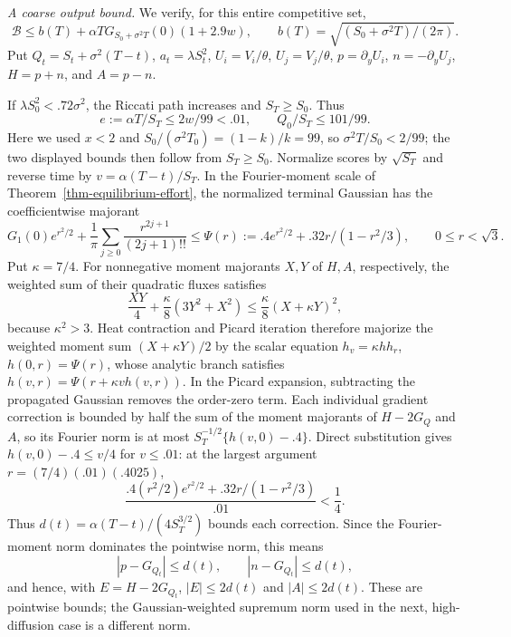 \documentclass[mnsc]{informs3}
\begin{document}
\begin{APPENDICES}
{\emph{A coarse output bound.}
We verify, for this entire competitive set,
\begin{equation}\label{eq-design-competitive-output-screen}
\mathcal B\leq b(T)+\alpha T G_{S_0+\sigma^2T}(0)(1+2.9w),
\qquad b(T)=\sqrt{(S_0+\sigma^2T)/(2\pi)}.
\end{equation}
Put $Q_t=S_t+\sigma^2(T-t)$, $a_t=\lambda S_t^2$,
$U_i=V_i/\theta$, $U_j=V_j/\theta$, $p=\partial_yU_i$, $n=-\partial_yU_j$,
$H=p+n$, and $A=p-n$.

If $\lambda S_0^2<.72\sigma^2$, the Riccati path increases and
$S_T\geq S_0$. Thus
\[
e:=\alpha T/S_T\leq2w/99<.01,\qquad Q_0/S_T\leq101/99.
\]
Here we used $x<2$ and
$S_0/(\sigma^2T_0)=(1-k)/k=99$, so
$\sigma^2T/S_0<2/99$; the two displayed bounds then follow from
$S_T\geq S_0$.
Normalize scores by $\sqrt{S_T}$ and reverse time by
$v=\alpha(T-t)/S_T$. In the Fourier-moment scale of
Theorem~\ref{thm-equilibrium-effort}, the normalized terminal Gaussian
has the coefficientwise majorant
\[
G_1(0)e^{r^2/2}+\frac1\pi\sum_{j\geq0}
\frac{r^{2j+1}}{(2j+1)!!}
\leq\Psi(r):=.4e^{r^2/2}+.32r/(1-r^2/3),\qquad 0\leq r<\sqrt3.
\]
Put $\kappa=7/4$. For nonnegative moment majorants $X,Y$ of $H,A$,
respectively, the weighted sum of their quadratic fluxes satisfies
\[
\frac{XY}{4}+\frac\kappa8(3Y^2+X^2)
\leq\frac\kappa8(X+\kappa Y)^2,
\]
because $\kappa^2>3$.
Heat contraction and Picard iteration therefore majorize
the weighted moment sum $(X+\kappa Y)/2$ by the scalar equation
$h_v=\kappa h h_r$, $h(0,r)=\Psi(r)$, whose analytic branch satisfies
$h(v,r)=\Psi(r+\kappa vh(v,r))$.
In the Picard expansion, subtracting the propagated Gaussian removes
the order-zero term. Each individual gradient correction is bounded
by half the sum of the moment majorants of $H-2G_Q$ and $A$,
so its Fourier norm is at most
$S_T^{-1/2}\{h(v,0)-.4\}$.
Direct substitution gives $h(v,0)-.4\leq v/4$ for $v\leq.01$:
at the largest argument $r=(7/4)(.01)(.4025)$,
\[
\frac{.4(r^2/2)e^{r^2/2}+.32r/(1-r^2/3)}{.01}<\frac14.
\]
Thus $d(t)=\alpha(T-t)/(4S_T^{3/2})$ bounds each correction.
Since the Fourier-moment norm dominates the pointwise norm, this means
\[
|p-G_{Q_t}|\leq d(t),\qquad |n-G_{Q_t}|\leq d(t),
\]
and hence, with $E=H-2G_{Q_t}$, $|E|\leq2d(t)$ and
$|A|\leq2d(t)$. These are pointwise bounds; the Gaussian-weighted
supremum norm used in the next, high-diffusion case is a different norm.

}
\end{APPENDICES}
\end{document}
